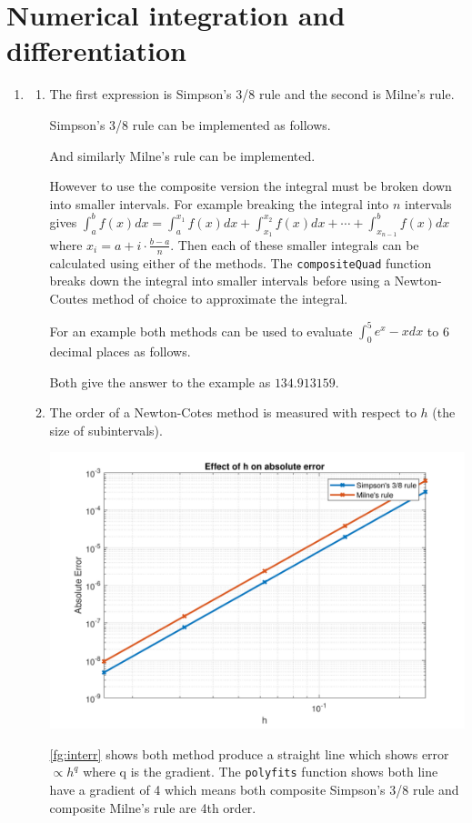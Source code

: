 \documentclass[a4paper,11pt]{article}
\begin{document}
\section{Numerical integration and differentiation}
\begin{enumerate}
	\item \begin{enumerate}
		\item The first expression is Simpson's 3/8 rule and the second is 
		Milne's rule.
		
		Simpson's 3/8 rule can be implemented as follows.
		
		And similarly Milne's rule can be implemented.
		
		However to use the composite version the integral must be broken down 
		into smaller intervals. For example breaking the integral into $n$ 
		intervals gives $\int_{a}^{b}f(x)dx = \int_{a}^{x_{1}}f(x)dx + 
		\int_{x_{1}}^{x_{2}}f(x)dx + \cdots + \int_{x_{n-1}}^{b}f(x)dx$ 
		where 
		$x_{i} = a + i \cdot \frac{b - a}{n}$. Then each of these smaller 
		integrals can be calculated using either of the methods. The 
		\verb*|compositeQuad| function breaks down the integral into smaller 
		intervals before using a Newton-Coutes method of choice to 
		approximate the integral.
		
		For an example both methods can be used to evaluate $\int_{0}^{5} 
		e^{x} - x dx$ to 6 decimal places as follows.
		
		Both give the answer to the example as $134.913159$.
		
		
		\item The order of a Newton-Cotes method is measured with respect to 
		$h$ (the size of subintervals).
		\begin{center}
			\includegraphics[scale=0.7]{images/Q2aii.pdf}
			\label{fg:interr}
		\end{center}
		\autoref{fg:interr} shows both method produce a straight line which 
		shows error $\propto h^{q}$ where q is the gradient. The 
		\verb*|polyfits| function shows both line have a gradient of 4 which 
		means both composite Simpson's 3/8 rule and composite Milne's rule 
		are 4th order.
		

\end{enumerate}
\end{enumerate}
\end{document}

